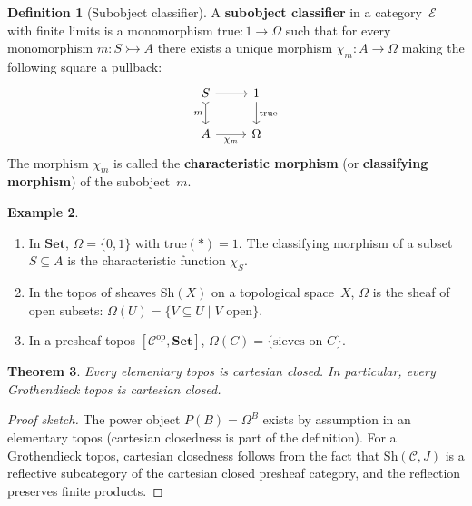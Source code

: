 \documentclass[a4paper,12pt]{book}
\newcommand{\Set}{\mathbf{Set}}
\newcommand{\op}{\mathrm{op}}
\theoremstyle{definition}
\newtheorem{definition}{Definition}[section]
\newtheorem{example}[definition]{Example}
\theoremstyle{plain}
\newtheorem{theorem}[definition]{Theorem}
\theoremstyle{remark}
\begin{document}
\begin{definition}[Subobject classifier]\label{def:subobject-classifier}
A \textbf{subobject classifier} in a category~$\mathcal{E}$ with
finite limits is a monomorphism $\mathrm{true}\colon 1\to\Omega$
such that for every monomorphism $m\colon S\rightarrowtail A$
there exists a unique morphism $\chi_m\colon A\to\Omega$ making the
following square a pullback:
\[
\begin{tikzcd}
S \arrow[r] \arrow[d, tail, "m"'] & 1 \arrow[d, "\mathrm{true}"] \\
A \arrow[r, "\chi_m"'] & \Omega
\end{tikzcd}
\]
The morphism $\chi_m$ is called the \textbf{characteristic morphism}
(or \textbf{classifying morphism}) of the subobject~$m$.
\end{definition}

\begin{example}\label{ex:subobject-classifier}
\begin{enumerate}[label=(\roman*)]
\item In $\Set$, $\Omega = \{0,1\}$ with $\mathrm{true}(*)=1$.
      The classifying morphism of a subset $S\subseteq A$ is
      the characteristic function $\chi_S$.
      \index{Set@$\Set$!subobject classifier}
\item In the topos of sheaves $\mathrm{Sh}(X)$ on a topological
      space~$X$, $\Omega$ is the sheaf of open subsets:
      $\Omega(U) = \{V\subseteq U \mid V\text{ open}\}$.
\item In a presheaf topos $[\mathcal{C}^{\op}, \Set]$,
      $\Omega(C) = \{\text{sieves on } C\}$.
\end{enumerate}
\end{example}

\begin{theorem}\label{thm:topos-ccc}
Every elementary topos is cartesian closed.  In particular, every
Grothendieck topos is cartesian closed.
\end{theorem}

\begin{proof}[Proof sketch]
The power object $P(B) = \Omega^B$ exists by assumption in an elementary
topos (cartesian closedness is part of the definition).  For a
Grothendieck topos, cartesian closedness follows from the fact that
$\mathrm{Sh}(\mathcal{C},J)$ is a reflective subcategory of the
cartesian closed presheaf category, and the reflection preserves
finite products.
\end{proof}
\end{document}
